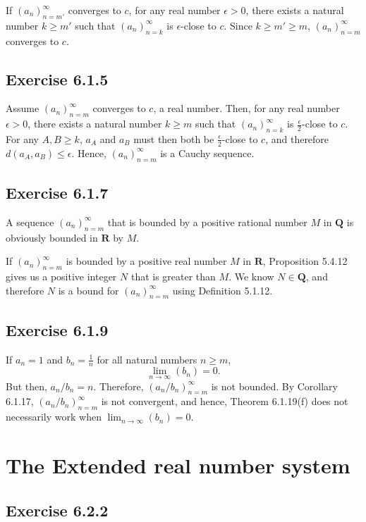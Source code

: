 \documentclass[12pt, oneside]{book}
\begin{document}
	If $(a_n)_{n = m'}^\infty$ converges to $c$, for any real number $\epsilon > 0$, there exists a natural number $k \ge m'$ such that $(a_n)_{n = k}^\infty$ is $\epsilon$-close to $c$. Since $k \ge m' \ge m$, $(a_n)_{n = m}^\infty$ converges to $c$.

	\subsection*{Exercise 6.1.5}

	Assume $(a_n)_{n = m}^\infty$ converges to $c$, a real number. Then, for any real number $\epsilon > 0$, there exists a natural number $k \ge m$ such that $(a_n)_{n = k}^\infty$ is $\frac{\epsilon}{2}$-close to $c$. For any $A, B \ge k$, $a_A$ and $a_B$ must then both be $\frac{\epsilon}{2}$-close to $c$, and therefore $d(a_A, a_B) \le \epsilon$. Hence, $(a_n)_{n = m}^\infty$ is a Cauchy sequence.

	\subsection*{Exercise 6.1.7}

	A sequence $(a_n)_{n = m}^\infty$ that is bounded by a positive rational number $M$ in $\mathbf{Q}$ is obviously bounded in $\mathbf{R}$ by $M$.

	If $(a_n)_{n = m}^\infty$ is bounded by a positive real number $M$ in $\mathbf{R}$, Proposition 5.4.12 gives us a positive integer $N$ that is greater than $M$. We know $N \in \mathbf{Q}$, and therefore $N$ is a bound for $(a_n)_{n = m}^\infty$ using Definition 5.1.12.

	\subsection*{Exercise 6.1.9}

	If $a_n = 1$ and $b_n = \frac{1}{n}$ for all natural numbers $n \ge m$,
	\[\lim_{n \to \infty} (b_n) = 0.\]
	But then, $a_n / b_n = n$. Therefore, $(a_n / b_n)_{n = m}^\infty$ is not bounded. By Corollary 6.1.17, $(a_n / b_n)_{n = m}^\infty$ is not convergent, and hence, Theorem 6.1.19(f) does not necessarily work when $\lim_{n \to \infty} (b_n) = 0$.

	\section{The Extended real number system}

	\subsection*{Exercise 6.2.2}
\end{document}
